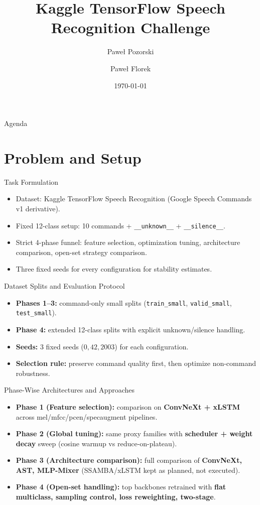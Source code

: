 \documentclass[aspectratio=169]{beamer}
\title{Kaggle TensorFlow Speech Recognition Challenge}
\author{Paweł Pozorski \and Paweł Florek}
\institute{Warsaw University of Technology}
\date{\today}
\begin{document}
\begin{frame}[plain]
    \titlepage
\end{frame}

\begin{frame}{Agenda}
    \tableofcontents
\end{frame}

\section{Problem and Setup}

\begin{frame}{Task Formulation}
    \begin{itemize}
        \item Dataset: Kaggle TensorFlow Speech Recognition (Google Speech Commands v1 derivative).
        \item Fixed 12-class setup: 10 commands + \texttt{\_\_unknown\_\_} + \texttt{\_\_silence\_\_}.
        \item Strict 4-phase funnel: feature selection, optimization tuning, architecture comparison, open-set strategy comparison.
        \item Three fixed seeds for every configuration for stability estimates.
    \end{itemize}
\end{frame}

\begin{frame}{Dataset Splits and Evaluation Protocol}
    \begin{itemize}
        \item \textbf{Phases 1--3:} command-only small splits (\texttt{train\_small}, \texttt{valid\_small}, \texttt{test\_small}).
        \item \textbf{Phase 4:} extended 12-class splits with explicit unknown/silence handling.
        \item \textbf{Seeds:} 3 fixed seeds (\(0,42,2003\)) for each configuration.
        \item \textbf{Selection rule:} preserve command quality first, then optimize non-command robustness.
    \end{itemize}
\end{frame}

\begin{frame}{Phase-Wise Architectures and Approaches}
    \small
    \begin{itemize}
        \item \textbf{Phase 1 (Feature selection):} comparison on \textbf{ConvNeXt + xLSTM} across mel/mfcc/pcen/specaugment pipelines.
        \item \textbf{Phase 2 (Global tuning):} same proxy families with \textbf{scheduler + weight decay} sweep (cosine warmup vs reduce-on-plateau).
        \item \textbf{Phase 3 (Architecture comparison):} full comparison of \textbf{ConvNeXt, AST, MLP-Mixer} (SSAMBA/xLSTM kept as planned, not executed).
        \item \textbf{Phase 4 (Open-set handling):} top backbones retrained with \textbf{flat multiclass, sampling control, loss reweighting, two-stage}.
    \end{itemize}
\end{frame}
\end{document}
